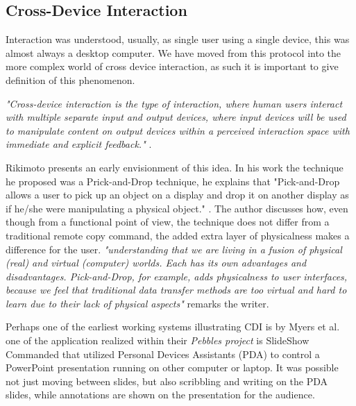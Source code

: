 \subsection{Cross-Device Interaction}
Interaction was understood, usually, as single user using a single device, this was almost always a desktop computer\cite{Levin:2014}. We have moved from this protocol into the more complex world of cross device interaction, as such it is important to give definition of this phenomenon.

\emph{"Cross-device interaction is the type of interaction, where human users interact with multiple separate input and output devices, where input devices will be used to manipulate content on output devices within a perceived interaction space with immediate and explicit feedback."} \cite{Scharf:2013}.

Rikimoto presents an early envisionment of this idea. In his work the technique he proposed was a Prick-and-Drop technique, he explains that "Pick-and-Drop allows a user to pick up an object on a display and drop it on another display as if he/she were manipulating a physical object." \cite{Rekimoto:1997}. The author discusses how, even though from a functional point of view, the technique does not differ from a traditional remote copy command, the added extra layer of physicalness makes a difference for the user. \emph{"understanding that we are living in a fusion of physical (real) and virtual (computer) worlds. Each has its own advantages and disadvantages. Pick-and-Drop, for example, adds physicalness to user interfaces, because we feel that traditional data transfer methods are too virtual and hard to learn due to their lack of physical aspects"} \cite{Rekimoto:1997} remarks the writer.

Perhaps one of the earliest working systems illustrating CDI is by Myers et al.
\cite{Myers:2001} one of the application realized within their \emph{Pebbles project} is SlideShow Commanded that utilized Personal Devices Assistants (PDA) to control a PowerPoint presentation running on other computer or laptop.
It was possible not just moving between slides, but also scribbling and writing on the PDA slides, while annotations are shown on the presentation for the audience.

